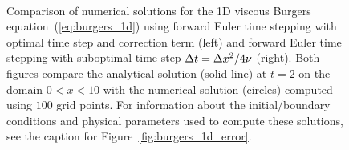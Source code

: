 \documentclass[fleqn,12pt,twoside]{article}
\begin{document}
\begin{figure}[tb]
\begin{center}
\ \ \ \ \ 
\caption{Comparison of numerical solutions for the 1D viscous Burgers 
equation~(\ref{eq:burgers_1d}) using forward Euler time stepping with 
optimal time step and correction term (left) and forward Euler time 
stepping with suboptimal time step $\Delta t = \Delta x^2/4 \nu$ (right).  
Both figures compare the analytical solution (solid line) at $t = 2$ on the 
domain $0 < x < 10$ with the numerical solution (circles) computed using 
$100$ grid points.  
For information about the initial/boundary conditions and physical parameters 
used to compute these solutions, see the caption for 
Figure~\ref{fig:burgers_1d_error}. 
}
\label{fig:burgers_1d_solns}
\end{center}
\end{figure}
\end{document}
